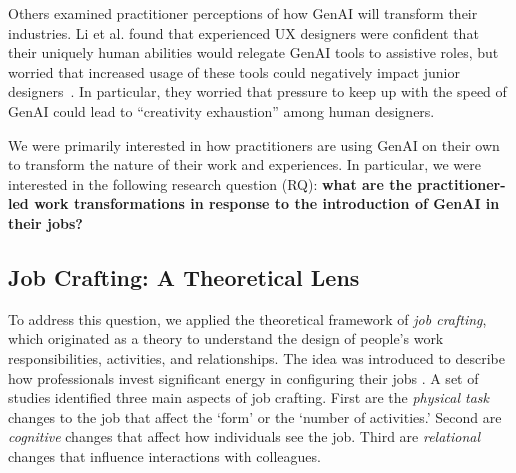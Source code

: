 Others examined practitioner perceptions of how GenAI will transform their industries.
Li et al. found that experienced UX designers were confident that their uniquely human abilities would relegate GenAI tools to assistive roles, but worried that increased usage of these tools could negatively impact junior designers~\cite{li2024user}. In particular, they worried that pressure to keep up with the speed of GenAI  could lead to ``creativity exhaustion'' among human designers. 

We were primarily interested in how practitioners are using GenAI on their own to transform the nature of their work and experiences. In particular, we were interested in the following research question (RQ): \textbf{what are the practitioner-led work transformations in response to the introduction of GenAI in their jobs?}


\subsection{Job Crafting: A Theoretical Lens} \label{RW-jobcrafting}
To address this question, we applied the theoretical framework of \textit{job crafting}, which originated as a theory to understand the design of people's work responsibilities, activities, and relationships. 
The idea was introduced to describe how professionals invest significant energy in configuring their jobs \cite{Wrzesniewski_2001}. A set of studies identified three main aspects of job crafting. First are the \textit{physical task} changes to the job that affect the `form' or the `number of activities.' Second are \textit{cognitive} changes that affect how individuals see the job. Third are \textit{relational} changes that influence interactions with colleagues. 


